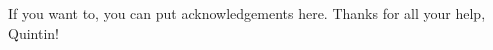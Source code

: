 \newpage
\vspace*{8cm}

\onehalfspacing
\begin{center}
	\large
	If you want to, you can put acknowledgements here. Thanks for all your help, Quintin!
\end{center}

\thispagestyle{empty}
